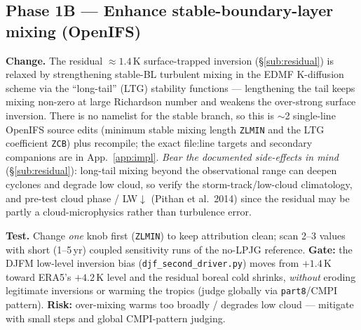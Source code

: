 \documentclass[10pt]{article}
\begin{document}
\subsection{Phase 1B --- Enhance stable-boundary-layer mixing (OpenIFS)}\label{sub:phase1b}
\textbf{Change.} The residual $\approx1.4$\,K surface-trapped inversion (\S\ref{sub:residual}) is relaxed by
strengthening stable-BL turbulent mixing in the EDMF K-diffusion scheme via the ``long-tail'' (LTG) stability
functions --- lengthening the tail keeps mixing non-zero at large Richardson number and weakens the over-strong
surface inversion. There is no namelist for the stable branch, so this is $\sim$2 single-line OpenIFS source edits
(minimum stable mixing length \texttt{ZLMIN} and the LTG coefficient \texttt{ZCB}) plus recompile; the exact
file:line targets and secondary companions are in App.~\ref{app:impl}. \emph{Bear the documented side-effects in
mind} (\S\ref{sub:residual}): long-tail mixing beyond the observational range can deepen cyclones and degrade low
cloud, so verify the storm-track/low-cloud climatology, and pre-test cloud phase / LW$\downarrow$ (Pithan et al.\
2014) since the residual may be partly a cloud-microphysics rather than turbulence error.

\textbf{Test.} Change \emph{one} knob first (\texttt{ZLMIN}) to keep attribution clean; scan 2--3 values with short
(1--5\,yr) coupled sensitivity runs of the no-LPJG reference. \textbf{Gate:} the DJFM low-level inversion bias
(\texttt{djf\_second\_driver.py}) moves from $+1.4$\,K toward ERA5's $+4.2$\,K level and the residual boreal cold
shrinks, \emph{without} eroding legitimate inversions or warming the tropics (judge globally via \texttt{part8}/CMPI
pattern). \textbf{Risk:} over-mixing warms too broadly / degrades low cloud --- mitigate with small steps and
global CMPI-pattern judging.
\end{document}
